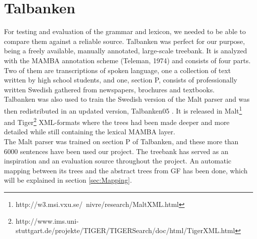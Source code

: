 \documentclass{report}
\begin{document}
%
%


\section{Talbanken}
\label{sec:talbanken}
For testing and evaluation of the grammar and lexicon, we needed to be able to
compare them against a reliable source.
Talbanken \cite{talbanken} was perfect for our purpose,
being a freely available, manually annotated, large-scale treebank.
It is analyzed with the MAMBA annotation scheme (Teleman, 1974) and 
consists of four
parts. Two of them are transcriptions of spoken language, one a collection of
text written by high school students, and one, section P,
consists of professionally written Swedish gathered from newspapers, brochures and textbooks.
\\
Talbanken was also used to train the Swedish version of the Malt parser \cite{malt}
and was then redistributed in an updated version,
Talbanken05 \cite{talbanken05}.
It is released in Malt\footnote{http://w3.msi.vxu.se/~nivre/research/MaltXML.html} 
and Tiger\footnote{http://www.ims.uni-stuttgart.de/projekte/TIGER/TIGERSearch/doc/html/TigerXML.html}
XML-formats
where the trees had been made deeper and more detailed while still containing
the lexical MAMBA layer. \\
The Malt parser was trained on section P of Talbanken, and these
more than 6000 sentences have been used our project. 
The treebank has served as an inspiration and an evaluation source throughout the
project. An automatic mapping between its trees and the abstract trees from GF has been
done, which will be explained in section \ref{sec:Mapping}.
\end{document}
